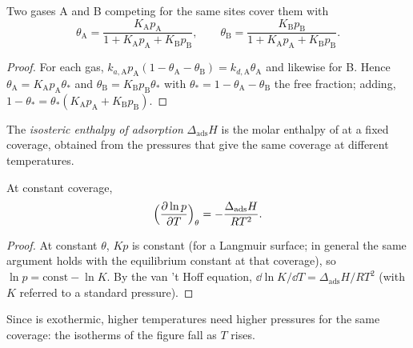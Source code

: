 \begin{proposition}\label{prop:b3:surfaces-catalysis:competitive}
Two gases A and B competing for the same sites cover them with
\[
  \theta_{\mathrm A} = \frac{K_{\mathrm A}p_{\mathrm A}}{1 + K_{\mathrm A}p_{\mathrm A} + K_{\mathrm B}p_{\mathrm B}}, \qquad
  \theta_{\mathrm B} = \frac{K_{\mathrm B}p_{\mathrm B}}{1 + K_{\mathrm A}p_{\mathrm A} + K_{\mathrm B}p_{\mathrm B}} .
\]
\end{proposition}

\begin{proof}
For each gas, $k_{a,\mathrm A}p_{\mathrm A}(1 - \theta_{\mathrm A} - \theta_{\mathrm B}) = k_{d,\mathrm A}\theta_{\mathrm A}$ and likewise for B. Hence
$\theta_{\mathrm A} = K_{\mathrm A}p_{\mathrm A}\theta_\ast$ and $\theta_{\mathrm B} = K_{\mathrm B}p_{\mathrm B}\theta_\ast$ with $\theta_\ast = 1 - \theta_{\mathrm A} - \theta_{\mathrm B}$ the free fraction; adding,
$1 - \theta_\ast = \theta_\ast(K_{\mathrm A}p_{\mathrm A} + K_{\mathrm B}p_{\mathrm B})$.
\end{proof}

\begin{definition}\label{def:b3:surfaces-catalysis:isosteric}
The \emph{isosteric enthalpy of adsorption}
$\Delta_{\mathrm{ads}}H$ is the molar enthalpy of  at a fixed coverage,
obtained from the pressures that give the same coverage at different
temperatures.
\end{definition}

\begin{proposition}\label{prop:b3:surfaces-catalysis:isosteric}
At constant coverage,
\[
  \Bigl(\frac{\partial\ln p}{\partial T}\Bigr)_\theta = -\frac{\Delta_{\mathrm{ads}}H}{RT^2} .
\]
\end{proposition}

\begin{proof}
At constant $\theta$, $Kp$ is constant (for a Langmuir surface; in general the same
argument holds with the equilibrium constant at that coverage), so $\ln p =
\text{const} - \ln K$. By the van 't Hoff equation, $\dd\ln K/\dd T = \Delta_{\mathrm{ads}}H/RT^2$ (with $K$
referred to a standard pressure).
\end{proof}

Since  is exothermic, higher temperatures need higher pressures for
the same coverage: the isotherms of the figure fall as $T$ rises.

